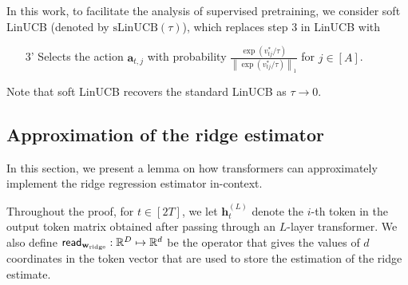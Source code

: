 \documentclass[10pt]{article}
\newcommand{\norm}[1]{\left\|{#1}\right\|}
\newcommand{\lone}[1]{\norm{#1}_1}
\newcommand{\<}{\left\langle}
\renewcommand{\>}{\right\rangle}
\renewcommand{\read}{{\sf read}}
\newcommand{\ridge}{{\rm ridge}}
\newcommand{\R}{\mathbb{R}}
\newcommand{\sLinUCB}{{\mathrm{sLinUCB}}}
\newcommand{\temp}{{\tau}}
\newcommand{\totlen}{{T}}
\def\ba{{\mathbf a}}
\def\bh{{\mathbf h}}
\def\bw{{\mathbf w}}
\begin{document}
In this work, to facilitate the analysis of supervised pretraining, we consider soft LinUCB (denoted by $\sLinUCB(\temp)$), which replaces step 3 in LinUCB with
\begin{enumerate}
    \item [3'] Selects the action $\ba_{t,j}$ with probability $\frac{\exp(v^*_{tj}/\temp)}{\lone{\exp(v^*_{tj}/\temp)}}$ for $j\in[A]$. 
\end{enumerate} Note that soft LinUCB recovers the standard LinUCB as $\temp\to0$. 













\subsection{Approximation of the ridge estimator}\label{app:approx-ridge-estimator}
In this section, we present a lemma on how transformers can  approximately implement the ridge regression estimator in-context. 






















Throughout the proof, for $t\in[2\totlen]$,  we let $\bh_{t}^{(L)}$ denote the $i$-th token in the output token matrix obtained after passing through an $L$-layer transformer. We also define  $\read_{\bw_\ridge}: \R^{D}\mapsto\R^{d}$ be the operator that gives the values of  $d$ coordinates  in the token vector that are used to store the estimation of  the ridge estimate.
\end{document}
